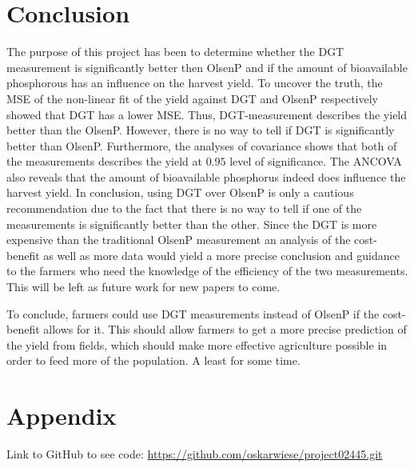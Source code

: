 \documentclass[11pt, fleqn, titlepage]{article}
\begin{document}
\section{Conclusion}

The purpose of this project has been to determine whether the DGT measurement is significantly better then OlsenP and if the amount of bioavailable phosphorous has an influence on the harvest yield. To uncover the truth, the MSE of the non-linear fit of the yield against DGT and OlsenP respectively showed that DGT has a lower MSE. Thus, DGT-measurement describes the yield better than the OlsenP. However, there is no way to tell if DGT is significantly better than OlsenP. Furthermore, the analyses of covariance shows that both of the measurements describes the yield at $ 0.95 $ level of significance. The ANCOVA also reveals that the amount of bioavailable phosphorus indeed does influence the harvest yield. In conclusion, using DGT over OlsenP is only a cautious recommendation due to the fact that there is no way to tell if one of the measurements is significantly better than the other. Since the DGT is more expensive than the traditional OlsenP measurement an analysis of the cost-benefit as well as more data would yield a more precise conclusion and guidance to the farmers who need the knowledge of the efficiency of the two measurements. This will be left as future work for new papers to come.

To conclude, farmers could use DGT measurements instead of OlsenP if the cost-benefit allows for it. This should allow farmers to get a more precise prediction of the yield from fields, which should make more effective agriculture possible in order to feed more of the population. A least for some time.
\newpage

\section{Appendix}

Link to GitHub to see code:
\url{https://github.com/oskarwiese/project02445.git}



\end{document}
